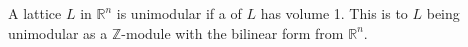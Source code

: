 \documentclass[12pt]{article}
\begin{document}
A lattice $L$ in $\mathbb{R}^n$ is unimodular if a  of $L$ has volume 1.  This is  to $L$ being unimodular as a $\mathbb{Z}$-module with the bilinear form  from $\mathbb{R}^n$.

\end{document}
